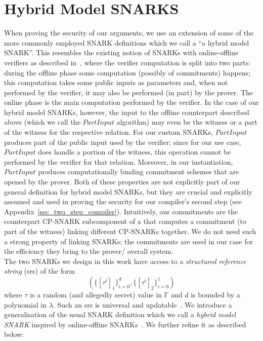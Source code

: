 \section{Hybrid Model SNARKS}
\label{sec:snarks_defs}
\noindent When proving the security of our arguments, we use an extension of some of the more commonly employed SNARK definitions which we call a ``a hybrid model SNARK''. This resembles the existing notion of SNARKs with online-offline verifiers as described in~\cite{HP_paper}, where the 
verifier computation is split into two parts: during the offline phase some computation (possibly of commitments) happens; this computation takes some public inputs as parameters and, when not performed by the verifier, it may also be performed (in part) by the prover. The online phase is the main computation performed by the verifier. In the case of our hybrid model SNARKs, however, the input to the offline counterpart described above (which we call the $\mathit{PartInput}$ algorithm) may even be the witness or 
a part of the witness for the respective relation. For our custom SNARKs, $\mathit{PartInput}$ produces part of the public input used by the verifier; 
since for our use case, $\mathit{PartInput}$ does handle a portion of the witness, this operation cannot be performed by the verifier for that relation. 
Moreover, in our instantiation, $\mathit{PartInput}$ produces computationally binding commitment schemes that are opened by the prover. Both of these properties 
are not explicitly part of our general definition for hybrid model SNARKs, but they are crucial and explicitly assumed and used 
in proving the security for our compiler's second step (see Appendix~\ref{sec_two_step_compiler}). Intuitively, our commitments 
are the counterpart CP-SNARK subcomponent of a that computes a commitment (to part of the witness) linking different CP-SNARKs together. 
We do not need such a strong property of linking SNARKs; the commitments are used in our case for the efficiency they bring to the prover/ overall system.\\

\noindent The two SNARKs we design in this work have access to a \emph{structured reference string} (srs) of the form 
$$(\{[\tau^i]_1\}_{i=0}^{d}, \{[\tau^i]_2\}_{i=0}^{1})$$ where $\tau$ is a random (and allegedly secret) value in $\mathbb{F}$ and $d$ 
is bounded by a polynomial in $\lambda$. Such an srs is universal and updatable~\cite{updatable_universal_srs_2018}. 
We introduce a generalisation of the usual SNARK definition which we call a \emph{hybrid model SNARK} inspired by online-offline SNARKs~\cite{HP_paper}. We further refine it as described below:     

